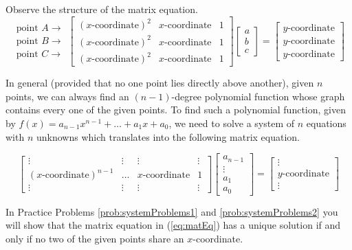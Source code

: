 \documentclass{ximera}
\begin{document}
\begin{exploration}
Observe the structure of the matrix equation.
$$\begin{matrix}\text{point }A\rightarrow\\\text{point }B\rightarrow\\\text{point }C\rightarrow\end{matrix}\begin{bmatrix}(x\text{-coordinate})^2&x\text{-coordinate} & 1\\(x\text{-coordinate})^2&x\text{-coordinate} & 1\\(x\text{-coordinate})^2&x\text{-coordinate} & 1\end{bmatrix}\begin{bmatrix}a\\b\\c\end{bmatrix}=\begin{bmatrix}y\text{-coordinate}\\y\text{-coordinate}\\y\text{-coordinate}\end{bmatrix}$$
\end{exploration}

In general (provided that no one point lies directly above another), given $n$ points, we can always find an $(n-1)$-degree polynomial function whose graph contains every one of the given points.  To find such a polynomial function, given by $f(x)=a_{n-1}x^{n-1}+\dots +a_1x+a_0$, we need to solve a system of $n$ equations with $n$ unknowns which translates into the following matrix equation.

\begin{equation}\label{eq:matEq}\begin{bmatrix}\vdots&\vdots &\vdots &\vdots\\(x\text{-coordinate})^{n-1}&\dots &x\text{-coordinate} &1\\\vdots&\vdots &\vdots &\vdots\end{bmatrix}\begin{bmatrix}a_{n-1}\\\vdots\\a_1\\a_0\end{bmatrix}=\begin{bmatrix}\vdots\\y\text{-coordinate}\\\vdots\end{bmatrix}\end{equation}

In Practice Problems \ref{prob:systemProblems1} and \ref{prob:systemProblems2} you will show that the matrix equation in (\ref{eq:matEq}) has a unique solution if and only if no two of the given points share an $x$-coordinate.
\end{document}
